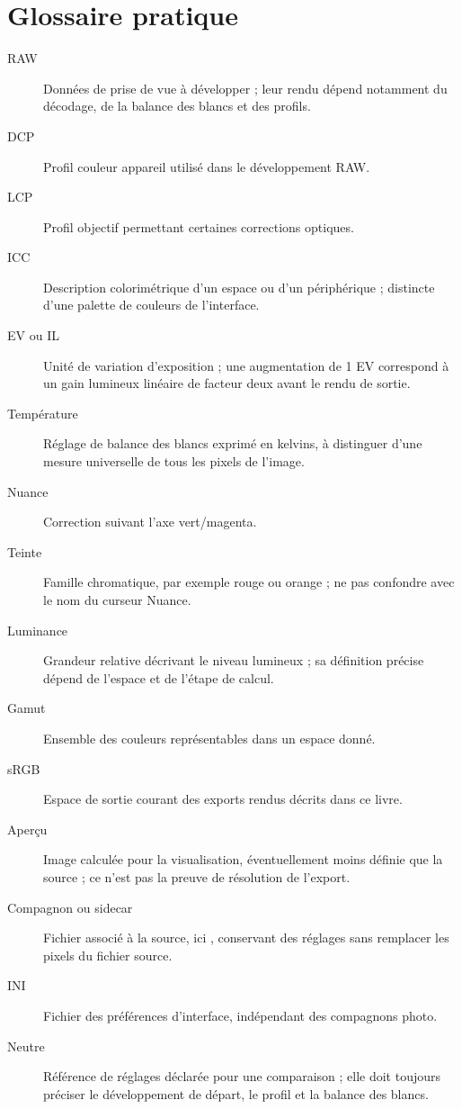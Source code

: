 \chapter{Glossaire pratique}
\begin{description}
\item[RAW] Données de prise de vue à développer ; leur rendu dépend notamment
du décodage, de la balance des blancs et des profils.
\item[DCP] Profil couleur appareil utilisé dans le développement RAW.
\item[LCP] Profil objectif permettant certaines corrections optiques.
\item[ICC] Description colorimétrique d’un espace ou d’un périphérique ;
distincte d’une palette de couleurs de l’interface.
\item[EV ou IL] Unité de variation d’exposition ; une augmentation de 1 EV
correspond à un gain lumineux linéaire de facteur deux avant le rendu de sortie.
\item[Température] Réglage de balance des blancs exprimé en kelvins, à
distinguer d’une mesure universelle de tous les pixels de l’image.
\item[Nuance] Correction suivant l’axe vert/magenta.
\item[Teinte] Famille chromatique, par exemple rouge ou orange ; ne pas
confondre avec le nom du curseur Nuance.
\item[Luminance] Grandeur relative décrivant le niveau lumineux ; sa définition
précise dépend de l’espace et de l’étape de calcul.
\item[Gamut] Ensemble des couleurs représentables dans un espace donné.
\item[sRGB] Espace de sortie courant des exports rendus décrits dans ce livre.
\item[Aperçu] Image calculée pour la visualisation, éventuellement moins définie
que la source ; ce n’est pas la preuve de résolution de l’export.
\item[Compagnon ou sidecar] Fichier associé à la source, ici ,
conservant des réglages sans remplacer les pixels du fichier source.
\item[INI] Fichier des préférences d’interface, indépendant des compagnons photo.
\item[Neutre] Référence de réglages déclarée pour une comparaison ; elle doit
toujours préciser le développement de départ, le profil et la balance des blancs.
\end{description}
